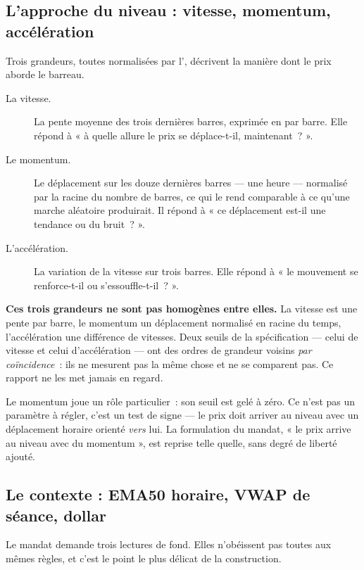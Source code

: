\subsection{L'approche du niveau : vitesse, momentum, accélération}

Trois grandeurs, toutes normalisées par l', décrivent la manière
dont le prix aborde le barreau.

\begin{description}
  \item[La vitesse.] La pente moyenne des trois dernières barres, exprimée en
   par barre. Elle répond à « à quelle allure le prix se
  déplace-t-il, maintenant~? ».
  \item[Le momentum.] Le déplacement sur les douze dernières barres --- une
  heure --- normalisé par la racine du nombre de barres, ce qui le rend
  comparable à ce qu'une marche aléatoire produirait. Il répond à « ce
  déplacement est-il une tendance ou du bruit~? ».
  \item[L'accélération.] La variation de la vitesse sur trois barres. Elle
  répond à « le mouvement se renforce-t-il ou s'essouffle-t-il~? ».
\end{description}

\begin{warningbox}
\textbf{Ces trois grandeurs ne sont pas homogènes entre elles.} La vitesse est
une pente par barre, le momentum un déplacement normalisé en racine du temps,
l'accélération une différence de vitesses. Deux seuils de la spécification
--- celui de vitesse et celui d'accélération --- ont des ordres de grandeur
voisins \emph{par coïncidence}~: ils ne mesurent pas la même chose et ne se
comparent pas. Ce rapport ne les met jamais en regard.
\end{warningbox}

Le momentum joue un rôle particulier~: son seuil est gelé à zéro. Ce n'est pas
un paramètre à régler, c'est un test de signe --- le prix doit arriver au
niveau avec un déplacement horaire orienté \emph{vers} lui. La formulation du
mandat, « le prix arrive au niveau avec du momentum », est reprise telle
quelle, sans degré de liberté ajouté.

\subsection{Le contexte : EMA50 horaire, VWAP de séance, dollar}

Le mandat demande trois lectures de fond. Elles n'obéissent pas toutes aux
mêmes règles, et c'est le point le plus délicat de la construction.

